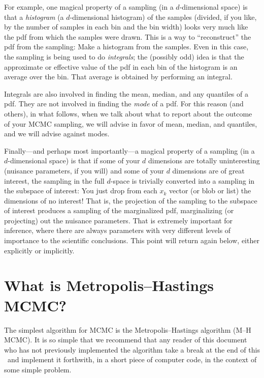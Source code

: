 \documentclass[12pt,twoside,pdftex]{article}
\begin{document}
For example, one magical property of a sampling (in a $d$-dimensional space)
  is that a \emph{histogram} (a $d$-dimensional histogram) of the samples
  (divided, if you like, by the number of samples in each bin and the bin width)
  looks very much like the pdf from which the samples were drawn.
This is a way to ``reconstruct'' the pdf from the sampling:
Make a histogram from the samples.
Even in this case, the sampling is being used to do \emph{integrals};
  the (possibly odd) idea is that the approximate or effective value of the pdf in each bin
  of the histogram is an average over the bin.
That average is obtained by performing an integral.

Integrals are also involved in finding the mean, median, and any quantiles
  of a pdf.
They are not involved in finding the \emph{mode} of a pdf.
For this reason (and others), in what follows, when we talk about what to report
  about the outcome of your MCMC sampling,
  we will advise in favor of mean, median, and quantiles,
  and we will advise against modes.

Finally---and perhaps most importantly---a magical property of a sampling
  (in a $d$-dimensional space)
  is that if some of your $d$ dimensions are totally uninteresting
  (nuisance parameters, if you will)
  and some of your $d$ dimensions are of great interest,
  the sampling in the full $d$-space is trivially converted into a sampling in the subspace of interest:
You just drop from each $x_k$ vector (or blob or list) the dimensions of no interest!
That is, the projection of the sampling to the subspace of interest produces
  a sampling of the marginalized pdf, marginalizing (or projecting) out the nuisance parameters.%
That is extremely important for inference,
  where there are always parameters with very different levels of importance to the scientific conclusions.
This point will return again below, either explicitly or implicitly. %

\section{What is Metropolis--Hastings MCMC?}

The simplest algorithm for MCMC is the Metropolis--Hastings algorithm (M--H MCMC).
It is so simple that we recommend that any reader of this document
  who has not previously implemented the algorithm take a break at the end
  of this \sectionname\ and implement it forthwith, in a short piece of computer code,
  in the context of some simple problem.
\end{document}
